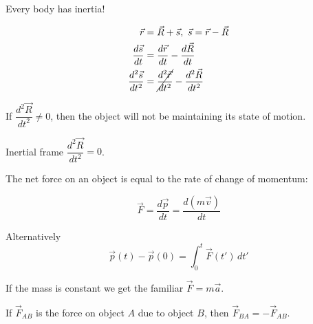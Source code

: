 \documentclass[10pt]{scrartcl}
\begin{document}
\begin{theorem}
Every body has inertia! 	
\end{theorem}

\begin{center}
\end{center}
\[
\begin{aligned}
  \vec{r} &= \vec{R} + \vec{s},~\vec{s} = \vec{r} - \vec{R}\\
  \frac{d\vec{s}}{dt} &= \frac{d\vec{r}}{dt} - \frac{d\vec{R}}{dt}\\
  \frac{d^2\vec{s}}{dt^2} &= \cancel{\frac{d^2\vec{r}}{dt^2}} - \frac{d^2\vec{R}}{dt^2}
\end{aligned}
\]

If $\dfrac{d^2\vec{R}}{dt^2} \neq 0$, then the object will not be maintaining its state of motion. 

Inertial frame $\dfrac{d^2\vec{R}}{dt^2} = 0$.\pagebreak




\begin{theorem}
The net force on an object is equal to the rate of change of momentum:

\[ \vec{F} = \frac{d\vec{p}}{dt} = \frac{d(m\vec{v})}{dt}\]
\end{theorem}

Alternatively 
\[\vec{p}(t) - \vec{p}(0) = \int_0^t \vec{F}(t')\,dt'\]

If the mass is constant we get the familiar $\vec{F} = m\vec{a}$.\\



\begin{theorem}
If $\vec{F}_{AB}$ is the force on object $A$ due to object $B$, then $\vec{F}_{BA} = -\vec{F}_{AB}$.
\end{theorem}
\end{document}
